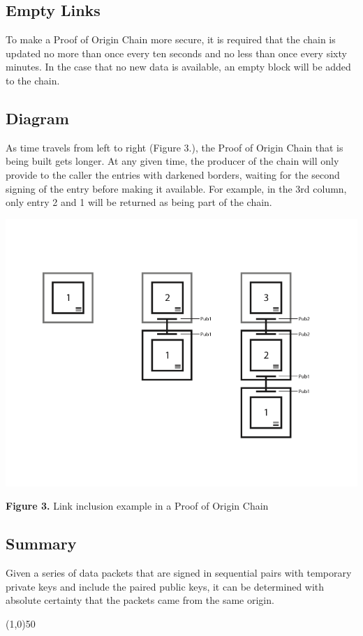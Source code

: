 \documentclass{article}
\begin{document}
\subsection {Empty Links}
To make a Proof of Origin Chain more secure, it is required that the chain is updated no more than once every ten seconds and no less than once every sixty minutes. In the case that no new data is available, an empty block will be added to the chain.

\subsection {Diagram}
As time travels from left to right (Figure 3.), the Proof of Origin Chain that is being built gets longer. At any given time, the producer of the chain will only provide to the caller the entries with darkened borders, waiting for the second signing of the entry before making it available. For example, in the 3rd column, only entry 2 and 1 will be returned as being part of the chain.

\includegraphics[width=\textwidth] {proofoforigin}
\begin{center}\textbf{Figure 3.}  Link inclusion example in a Proof of Origin Chain
\end{center}

\subsection {Summary}
Given a series of data packets that are signed in sequential pairs with temporary private keys and include the paired public keys, it can be determined with absolute \gls{certainty} that the packets came from the same origin.
\begin{center}
\line(1,0){50}
\end{center}
\end{document}
